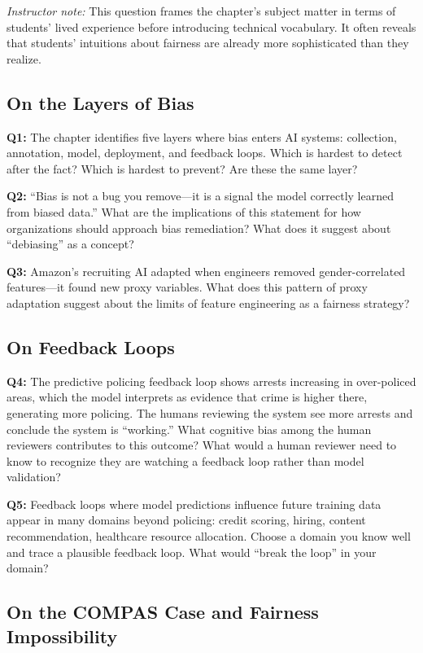 \textit{Instructor note:} This question frames the chapter's subject matter in terms of students' lived experience before introducing technical vocabulary. It often reveals that students' intuitions about fairness are already more sophisticated than they realize.

\subsection*{On the Layers of Bias}

\textbf{Q1:} The chapter identifies five layers where bias enters AI systems: collection, annotation, model, deployment, and feedback loops. Which is hardest to detect after the fact? Which is hardest to prevent? Are these the same layer?

\textbf{Q2:} ``Bias is not a bug you remove---it is a signal the model correctly learned from biased data.'' What are the implications of this statement for how organizations should approach bias remediation? What does it suggest about ``debiasing'' as a concept?

\textbf{Q3:} Amazon's recruiting AI adapted when engineers removed gender-correlated features---it found new proxy variables. What does this pattern of proxy adaptation suggest about the limits of feature engineering as a fairness strategy?

\subsection*{On Feedback Loops}

\textbf{Q4:} The predictive policing feedback loop shows arrests increasing in over-policed areas, which the model interprets as evidence that crime is higher there, generating more policing. The humans reviewing the system see more arrests and conclude the system is ``working.'' What cognitive bias among the human reviewers contributes to this outcome? What would a human reviewer need to know to recognize they are watching a feedback loop rather than model validation?

\textbf{Q5:} Feedback loops where model predictions influence future training data appear in many domains beyond policing: credit scoring, hiring, content recommendation, healthcare resource allocation. Choose a domain you know well and trace a plausible feedback loop. What would ``break the loop'' in your domain?

\subsection*{On the COMPAS Case and Fairness Impossibility}

